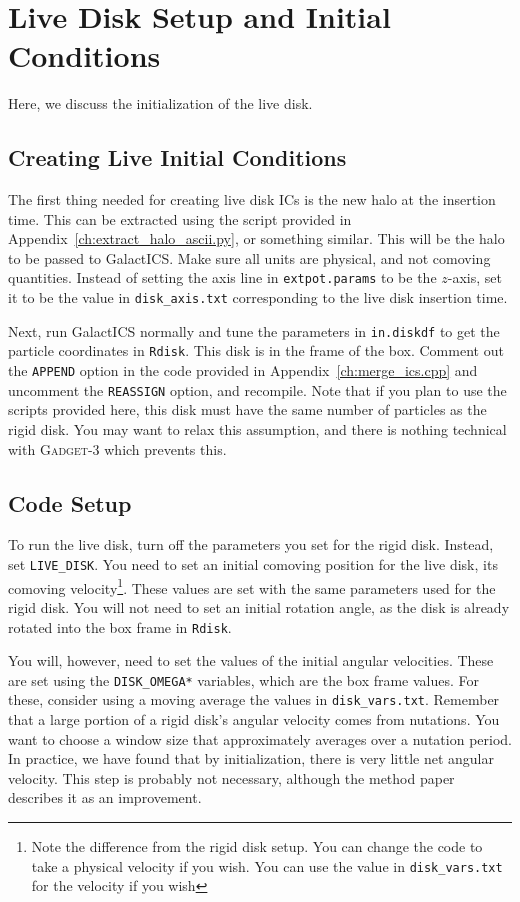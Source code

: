 \section{Live Disk Setup and Initial Conditions}

Here, we discuss the initialization of the live disk.

\subsection{Creating Live Initial Conditions}

The first thing needed for creating live disk ICs is the new halo at the insertion time. This can be extracted using the script provided in Appendix~\ref{ch:extract_halo_ascii.py}, or something similar. This will be the halo to be passed to GalactICS. Make sure all units are physical, and not comoving quantities. Instead of setting the axis line in \texttt{extpot.params} to be the $z$-axis, set it to be the value in \texttt{disk\_axis.txt} corresponding to the live disk insertion time. 

Next, run GalactICS normally and tune the parameters in \texttt{in.diskdf} to get the particle coordinates in \texttt{Rdisk}. This disk is in the frame of the box. Comment out the \texttt{APPEND} option in the code provided in Appendix~\ref{ch:merge_ics.cpp} and uncomment the \texttt{REASSIGN} option, and recompile. Note that if you plan to use the scripts provided here, this disk must have the same number of particles as the rigid disk. You may want to relax this assumption, and there is nothing technical with \textsc{Gadget-3} which prevents this. 

\subsection{Code Setup}

To run the live disk, turn off the parameters you set for the rigid disk. Instead, set \texttt{LIVE\_DISK}. You need to set an initial comoving position for the live disk, its comoving velocity\footnote{Note the difference from the rigid disk setup. You can change the code to take a physical velocity if you wish. You can use the value in \texttt{disk\_vars.txt} for the velocity if you wish}. These values are set with the same parameters used for the rigid disk. You will not need to set an initial rotation angle, as the disk is already rotated into the box frame in \texttt{Rdisk}. 

You will, however, need to set the values of the initial angular velocities. These are set using the \texttt{DISK\_OMEGA*} variables, which are the box frame values. For these, consider using a moving average the values in \texttt{disk\_vars.txt}. Remember that a large portion of a rigid disk's angular velocity comes from nutations. You want to choose a window size that approximately averages over a nutation period. In practice, we have found that by initialization, there is very little net angular velocity. This step is probably not necessary, although the method paper describes it as an improvement.


